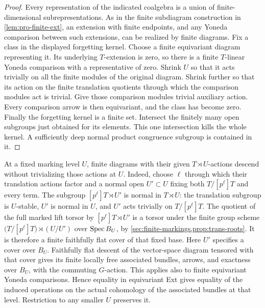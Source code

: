 \begin{proof}
Every representation of the indicated coalgebra is a union of
finite-dimensional subrepresentations.  As in the finite
subdiagram construction in \cref{lem:pro-finite-ext}, an
extension with finite endpoints, and any Yoneda comparison
between such extensions, can be realized by finite diagrams.
Fix a class in the displayed forgetting kernel.  Choose a
finite equivariant diagram representing it.  Its underlying
$T$-extension is zero, so there is a finite $T$-linear Yoneda
comparison with a representative of zero.  Shrink $U$ so that
it acts trivially on all the finite modules of the original
diagram.  Shrink further so that its action on the finite
translation quotients through which the comparison modules act
is trivial.  Give those comparison modules trivial auxiliary
action.  Every comparison arrow is then equivariant, and the
class has become zero.  Finally the forgetting kernel is a
finite set.  Intersect the finitely many open subgroups just
obtained for its elements.  This one intersection kills the
whole kernel.  A sufficiently deep normal product congruence
subgroup is contained in it.
\end{proof}

At a fixed marking level $U$, finite diagrams with their given
$T\rtimes U$-actions descend without trivializing those actions
at $U$.  Indeed, choose $\ell$ through which their translation
actions factor and a normal open $U'\subset U$ fixing both
$T/[p^\ell]T$ and every term.  The subgroup
$[p^\ell]T\rtimes U'$ is normal in $T\rtimes U$: the translation
subgroup is $U$-stable, $U'$ is normal in $U$, and $U'$ acts
trivially on $T/[p^\ell]T$.  The quotient of the full marked
lift torsor by $[p^\ell]T\rtimes U'$ is a torsor under the
finite group scheme
$\bigl(T/[p^\ell]T\bigr)\rtimes(U/U')$ over $\operatorname{Spec} B_U$,
by \cref{sec:finite-markings,prop:trans-roots}.
It is therefore a finite faithfully flat cover of that fixed base.
Here $U'$ specifies a cover over $B_U$.
Faithfully flat descent of the vector-space diagram tensored
with that cover gives its finite locally free associated bundles,
arrows, and exactness over $B_U$, with the commuting $G$-action.
This applies also to finite equivariant Yoneda comparisons.
Hence equality in equivariant Ext gives equality of the induced
operations on the actual cohomology of the associated bundles
at that level.  Restriction to any smaller $U$ preserves it.


